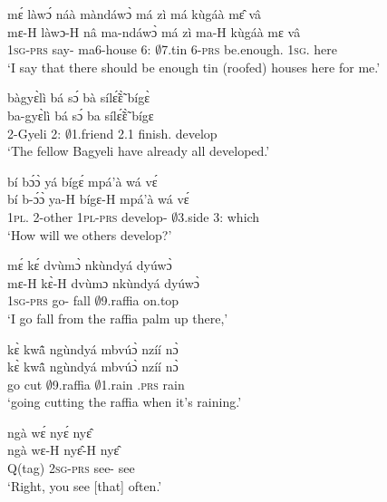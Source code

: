 \begin{exe}[(C234)]  
\exC\label{34} 
  \glll  mɛ́ làwɔ́ náà màndáwɔ̀ má zì má kùgáà mɛ̂ vâ \\
         mɛ-H làwɔ-H nâ ma-ndáwɔ̀ má zì ma-H kùgáà mɛ vâ \\
            1\textsc{sg}-\textsc{prs} say-{\R} {\COMP} ma6-house 6:{\ATT}  $\emptyset$7.tin 6-\textsc{prs} be.enough.{\SBJV}  1\textsc{sg}.{\OBJ} here \\
    \trans `I say that there should be enough tin (roofed) houses here for me.'
 
\exC\label{35}
  \glll   bàgyɛ̀lì bá sɔ́ bà sílɛ̃́ɛ̃̀ bígɛ̀ \\
           ba-gyɛ̀lì bá sɔ́ ba sílɛ̃́ɛ̃̀ bígɛ\\
           2-Gyeli 2:{\ATT}  $\emptyset$1.friend 2.{\PST}1 finish.{\COMPL} develop  \\
    \trans `The fellow Bagyeli have already all developed.'
 
\exC\label{36}
  \glll   bí bɔ́ɔ̀ yá bígɛ́ mpá'à wá vɛ́ \\
           bí b-ɔ́ɔ̀ ya-H bígɛ-H mpá'à wá vɛ́ \\
           1\textsc{pl}.{\SBJ}  2-other 1\textsc{pl}-\textsc{prs} develop-{\R} $\emptyset$3.side 3:{\ATT}  which  \\
    \trans `How will we others develop?'
 
\exC\label{37} 
  \glll   mɛ́ kɛ́ dvùmɔ̀ nkùndyá dyúwɔ̀ \\
         mɛ-H kɛ̀-H dvùmɔ nkùndyá dyúwɔ̀ \\
            1\textsc{sg}-\textsc{prs} go-{\R} fall $\emptyset$9.raffia on.top \\
    \trans `I go fall from the raffia palm up there,'
 
\exC\label{38} 
  \glll   kɛ̀ kwã̂ ngùndyá mbvúɔ̀ nzíí nɔ̀ \\
          kɛ̀ kwã̂ ngùndyá mbvúɔ̀ nzíí nɔ̀ \\
           go cut  $\emptyset$9.raffia $\emptyset$1.rain {\PROG}.\textsc{prs} rain \\
    \trans `going cutting the raffia when it's raining.'
 
\exC\label{39}
  \glll   ngà wɛ́ nyɛ́ nyɛ̂  \\
         ngà wɛ-H nyɛ̂-H nyɛ̂ \\
            Q(tag) 2\textsc{sg}-\textsc{prs} see-{\R} see \\
    \trans `Right, you see [that] often.'
 

\end{exe}
